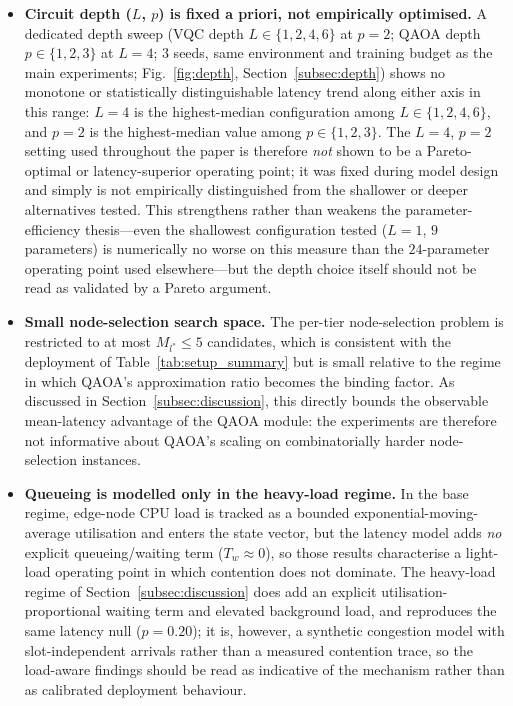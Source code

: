 \documentclass[11pt,a4paper]{article}
\theoremstyle{definition}
\begin{document}
\begin{itemize}
\item \textbf{Circuit depth ($L$, $p$) is fixed a priori, not empirically optimised.} A dedicated depth sweep (VQC depth $L\in\{1,2,4,6\}$ at $p{=}2$; QAOA depth $p\in\{1,2,3\}$ at $L{=}4$; $3$ seeds, same environment and training budget as the main experiments; Fig.~\ref{fig:depth}, Section~\ref{subsec:depth}) shows no monotone or statistically distinguishable latency trend along either axis in this range: $L{=}4$ is the highest-median configuration among $L\in\{1,2,4,6\}$, and $p{=}2$ is the highest-median value among $p\in\{1,2,3\}$. The $L{=}4$, $p{=}2$ setting used throughout the paper is therefore \emph{not} shown to be a Pareto-optimal or latency-superior operating point; it was fixed during model design and simply is not empirically distinguished from the shallower or deeper alternatives tested. This strengthens rather than weakens the parameter-efficiency thesis---even the shallowest configuration tested ($L{=}1$, $9$ parameters) is numerically no worse on this measure than the $24$-parameter operating point used elsewhere---but the depth choice itself should not be read as validated by a Pareto argument.

\item \textbf{Small node-selection search space.} The per-tier node-selection problem is restricted to at most $M_{l^*}\!\leq\!5$ candidates, which is consistent with the deployment of Table~\ref{tab:setup_summary} but is small relative to the regime in which QAOA's approximation ratio becomes the binding factor. As discussed in Section~\ref{subsec:discussion}, this directly bounds the observable mean-latency advantage of the QAOA module: the experiments are therefore not informative about QAOA's scaling on combinatorially harder node-selection instances.

\item \textbf{Queueing is modelled only in the heavy-load regime.} In the base regime, edge-node CPU load is tracked as a bounded exponential-moving-average utilisation and enters the state vector, but the latency model adds \emph{no} explicit queueing/waiting term ($T_w\!\approx\!0$), so those results characterise a light-load operating point in which contention does not dominate. The heavy-load regime of Section~\ref{subsec:discussion} does add an explicit utilisation-proportional waiting term and elevated background load, and reproduces the same latency null ($p=0.20$); it is, however, a synthetic congestion model with slot-independent arrivals rather than a measured contention trace, so the load-aware findings should be read as indicative of the mechanism rather than as calibrated deployment behaviour.


\end{itemize}
\end{document}
